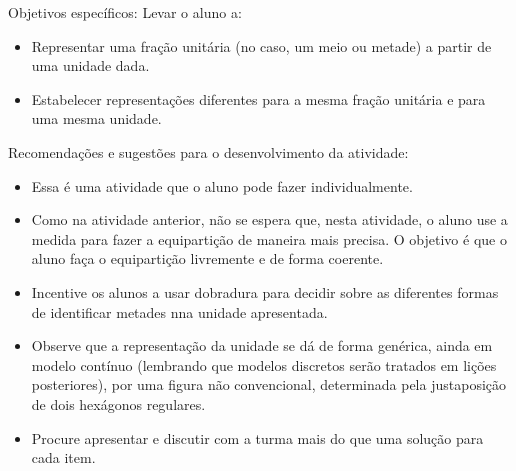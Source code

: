 \documentclass[a4paper,12pt,twoside]{book}
\begin{document}
\begin{professor*}[breakable]{}{}  
  
  Objetivos específicos: Levar o aluno a:  
\begin{itemize} %
    \item       Representar uma fração unitária (no caso, um meio ou metade) a partir de uma unidade dada.  
    \item       Estabelecer representações diferentes para a mesma fração unitária e para uma mesma unidade.
\end{itemize} %
  
  
  Recomendações e sugestões para o desenvolvimento da atividade:  
\begin{itemize} %
    \item       Essa é uma atividade que o aluno pode fazer individualmente. 
    \item       Como na atividade anterior, não se espera que, nesta atividade, o aluno use a medida para fazer a equipartição de maneira mais precisa. O objetivo é que o aluno faça o equipartição livremente e de forma coerente. 
    \item       Incentive os alunos a usar dobradura para decidir sobre as diferentes formas de identificar metades nna unidade apresentada.
    \item       Observe que a representação da unidade se dá de forma genérica, ainda em modelo contínuo (lembrando que modelos discretos serão tratados em lições posteriores), por uma figura não convencional, determinada pela justaposição de dois hexágonos regulares.
    \item       Procure apresentar e discutir com a turma mais do que uma solução para cada item.
\end{itemize} %
  
\end{professor*}
\end{document}
